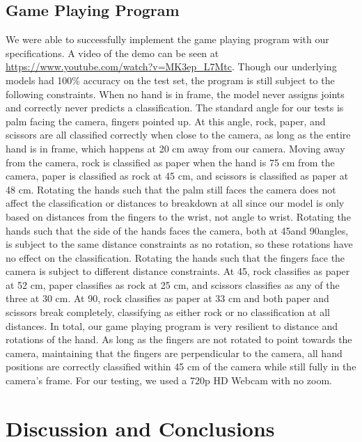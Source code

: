 \documentclass{article}
\begin{document}
\subsection{Game Playing Program}
We were able to successfully implement the game playing program with our specifications. A video of the demo can be seen at \url{https://www.youtube.com/watch?v=MK3ep_L7Mtc}. Though our underlying models had 100\% accuracy on the test set, the program is still subject to the following constraints. When no hand is in frame, the model never assigns joints and correctly never predicts a classification. The standard angle for our tests is palm facing the camera, fingers pointed up. At this angle, rock, paper, and scissors are all classified correctly when close to the camera, as long as the entire hand is in frame, which happens at 20 cm away from our camera. Moving away from the camera, rock is classified as paper when the hand is 75 cm from the camera, paper is classified as rock at 45 cm, and scissors is classified as paper at 48 cm. Rotating the hands such that the palm still faces the camera does not affect the classification or distances to breakdown at all since our model is only based on distances from the fingers to the wrist, not angle to wrist. Rotating the hands such that the side of the hands faces the camera, both at 45\textdegree and 90\textdegree angles, is subject to the same distance constraints as no rotation, so these rotations have no effect on the classification. Rotating the hands such that the fingers face the camera is subject to different distance constraints. At 45\textdegree, rock classifies as paper at 52 cm, paper classifies as rock at 25 cm, and scissors classifies as any of the three at 30 cm. At 90\textdegree, rock classifies as paper at 33 cm and both paper and scissors break completely, classifying as either rock or no classification at all distances. In total, our game playing program is very resilient to distance and rotations of the hand. As long as the fingers are not rotated to point towards the camera, maintaining that the fingers are perpendicular to the camera, all hand positions are correctly classified within 45 cm of the camera while still fully in the camera's frame. For our testing, we used a 720p HD Webcam with no zoom.

\section{Discussion and Conclusions}
\end{document}
